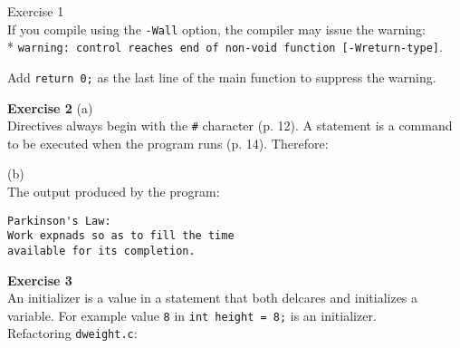 \documentclass[a4paper, 10pt]{article}
\begin{document}
%
Exercise 1 \\

If you compile using the \texttt{-Wall} option, the compiler may issue the warning:\\* 
\texttt{warning: control reaches end of non-void function [-Wreturn-type]}. 

Add \texttt{return 0;} as the last line of the main function to suppress the warning.

\textbf{Exercise 2} 
(a) \\
Directives always begin with the \texttt{\#} character (p. 12). A statement is a command to be executed when the program runs (p. 14). Therefore:

 
(b) \\
The output produced by the program: \\

\begin{lstlisting}
Parkinson's Law:
Work expnads so as to fill the time 
available for its completion.
\end{lstlisting}

\textbf{Exercise 3} \\
An initializer is a value in a statement that both delcares and initializes a variable. For example value \texttt{8} in \texttt{int height = 8;} is an initializer. \\

Refactoring \texttt{dweight.c}:\\

\end{document}
